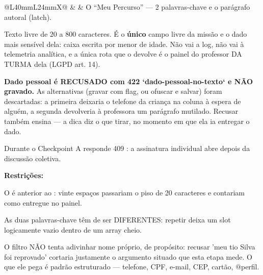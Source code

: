 \begin{tabularx}{\linewidth}{@{}L{40mm}L{24mm}X@{}}
\zebra {} &  & O \enquote{Meu Percurso} --- 2 palavras-chave e o parágrafo autoral (latch).\par Texto livre de 20 a 800 caracteres. É o \textbf{único} campo livre da missão e o dado mais sensível dela: caixa escrita por menor de idade. Não vai a log, não vai à telemetria analítica, e a única rota que o devolve é o painel do professor DA TURMA dela (LGPD art. 14).\par \textbf{Dado pessoal é RECUSADO com 422 `dado-pessoal-no-texto` e NÃO gravado.} As alternativas (gravar com flag, ou ofuscar e salvar) foram descartadas: a primeira deixaria o telefone da criança na coluna à espera de alguém, a segunda devolveria à professora um parágrafo mutilado. Recusar também ensina --- a dica diz o que tirar, no momento em que ela ia entregar o dado.\par Durante o Checkpoint A responde 409 : a assinatura individual abre depois da discussão coletiva.\par \textbf{Restrições:}\par \hspace*{1em}\textbullet{} O  é anterior ao : vinte espaços passariam o piso de 20 caracteres e contariam como entregue no painel.\par \hspace*{1em}\textbullet{} As duas palavras-chave têm de ser DIFERENTES: repetir deixa um slot logicamente vazio dentro de um array cheio.\par \hspace*{1em}\textbullet{} O filtro NÃO tenta adivinhar nome próprio, de propósito: recusar 'meu tio Silva foi reprovado' cortaria justamente o argumento situado que esta etapa mede. O que ele pega é padrão estruturado --- telefone, CPF, e-mail, CEP, cartão, @perfil.\\

\end{tabularx}
